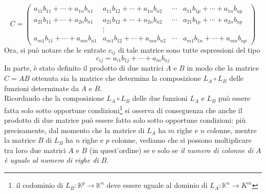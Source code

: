 \documentclass{book}
\theoremstyle{definition}
\theoremstyle{plain}
\begin{document}
\begin{equation}
  \label{eq:Compinveeproddimatrici4}
  C=
  \left(
    \begin{array}{cccc}
      a_{11}b_{11}+\cdots+a_{1n}b_{n1}& a_{11}b_{12}+\cdots+a_{1n}b_{n2}& \cdots & a_{11}b_{1p}+\cdots+a_{1n}
                                                                                   b_{np}\\
      a_{21}b_{11}+\cdots+a_{2n}b_{n1} & a_{21}b_{12}+\cdots+a_{2n}b_{n2}& \cdots & a_{21}b_{1p}+\cdots+a_{2n}
                                                                                    b_{np}\\
                                      & \vdots\\
      a_{m1}b_{11}+\cdots+a_{mn}b_{n1} & a_{m1}b_{12}+\cdots+a_{mn}b_{n2} & \cdots & a_{m1}b_{1n}+\cdots+a_{mn}
                                                                                     b_{np}
    \end{array}
  \right)
\end{equation}
Ora, si può notare che le entrate $c_{ij}$ di tale matrice sono tutte espressioni del tipo
\begin{equation}
  \label{eq:Compinveeproddimatrici5}
  c_{ij}=a_{i1}b_{1j}+\cdots+a_{in} b_{nj}
\end{equation}
In parte, è stato definito il prodotto di due matrici $A$ e $B$ in modo che la matrice $C=AB$ ottenuta sia
la matrice che determina la composizione $L_A\circ L_B$ delle funzioni determinate da $A$ e $B$.\\
Ricordando che la composizione $L_A\circ L_B$ delle due funzioni $L_A$ e $L_B$ può essere fatta solo sotto
opportune condizioni\footnote{il codominio di $L_B:\mathds{K}^p\to\mathds{K}^n$ deve essere uguale al dominio
  di $L_A:\mathds{K}^n\to K^m$} si osserva di conseguenza che anche il prodotto di due matrice può essere
fatto solo sotto opportune condizioni: più precisamente, dal momento che la matrice di $L_A$ ha $m$ righe
e $n$ colonne, mentre la matrice $B$ di $L_B$ ha $n$ righe e $p$ colonne, vediamo che si possono moltiplicare
tra loro due matrici $A$ e $B$ (in quest'ordine) se e solo se \textit{il numero di colonne di $A$ è uguale
  al numero di righe di $B$}.
\end{document}
